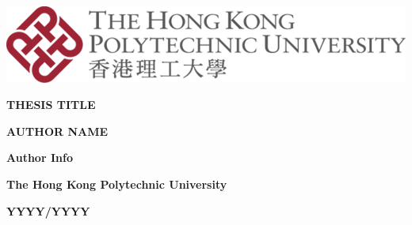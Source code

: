 \newcommand{\thesistitle}{Thesis Title}
\newcommand{\authorname}{Author Name}
\newcommand{\authorinfo}{Author Info}
\newcommand{\thesisdescription}{A thesis submitted in partial fulfilment of the requirements of the degree of Master of Philosophy/Doctor of Philosophy}
\newcommand{\deptname}{Department Name}
\newcommand{\univname}{The Hong Kong Polytechnic University}
\newcommand{\supervisorname}{Title FirstName LastName}
\newcommand{\yearofaward}{YYYY/YYYY}
\newcommand{\submissiondate}{MM/YYYY}


\newcommand\printlogo{
    \includegraphics[keepaspectratio=true, width=0.4\pdfpagewidth]{images/template/polyu_logo.png}
}

\newcommand\blankpage{
    \null
    \newpage}


\printlogo
\begin{center}

\vspace*{.1\textheight}
{\LARGE \textbf{\MakeUppercase{\thesistitle}}\par}\vspace{0.5cm}

\vspace*{.05\textheight}
{\LARGE \textbf{\MakeUppercase{\authorname}}\par}\vspace{0.5cm}

\vspace*{.05\textheight}
{\LARGE \textbf{\authorinfo}\par}\vspace{0.5cm}

\vspace*{.25\textheight}
{\LARGE \textbf{\univname}\par}\vspace{0.5cm}

\vspace*{.05\textheight}
{\LARGE \textbf{\MakeUppercase{\yearofaward}}\par}\vspace{0.5cm}

\vfill
\end{center}
\afterpage{\blankpage}


